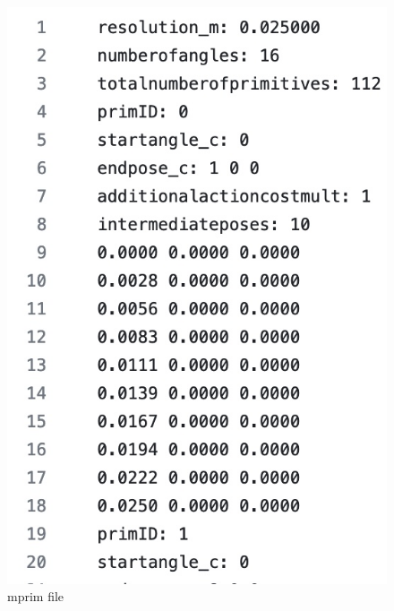 \documentclass[numberofslides]{AMSBeamer}
\begin{document}
\begin{frame}[label=sbpl]
\begin{minipage}{0.3\textwidth}
\begin{figure}
            \includegraphics[width = \textwidth]{Presentations/LaTeX/images/mprim.jpeg}
            \caption{mprim file}
        \end{figure}
    \end{minipage}
\end{frame}
\end{document}
